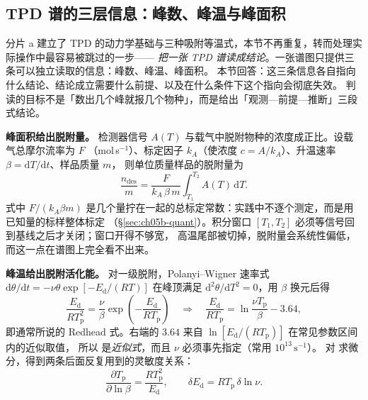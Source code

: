 \subsection{TPD 谱的三层信息：峰数、峰温与峰面积}
\label{sec:ch05b-read}

\begin{probout}
分片 a 建立了 TPD 的动力学基础与三种吸附等温式，本节不再重复，转而处理实际操作中最容易被跳过的一步——
\emph{把一张 TPD 谱读成结论}。一张谱图只提供三条可以独立读取的信息：峰数、峰温、峰面积。
本节回答：这三条信息各自指向什么结论、结论成立需要什么前提、以及在什么条件下这个指向会彻底失效。
判读的目标不是「数出几个峰就报几个物种」，而是给出「观测—前提—推断」三段式结论。
\end{probout}

\begin{principle}
\textbf{峰面积给出脱附量。} 检测器信号 $A(T)$ 与载气中脱附物种的浓度成正比。设载气总摩尔流率为 $F$
（mol\,s$^{-1}$）、标定因子 $k_A$（使浓度 $c=A/k_A$）、升温速率 $\beta=\mathrm{d}T/\mathrm{d}t$、样品质量 $m$，
则单位质量样品的脱附量为
\begin{equation}
\frac{n_{\mathrm{des}}}{m}
=\frac{F}{k_A\,\beta\,m}\int_{T_1}^{T_2} A(T)\,\mathrm{d}T .
\label{eq:ch05b-area}
\end{equation}
式中 $F/(k_A\beta m)$ 是几个量拧在一起的总标定常数：实践中不逐个测定，而是用已知量的标样整体标定
（\S\ref{sec:ch05b-quant}）。积分窗口 $[T_1,T_2]$ 必须等信号回到基线之后才关闭；窗口开得不够宽，
高温尾部被切掉，脱附量会系统性偏低，而这一点在谱图上完全看不出来。

\textbf{峰温给出脱附活化能。} 对一级脱附，Polanyi--Wigner 速率式
$\mathrm{d}\theta/\mathrm{d}t=-\nu\theta\exp[-E_{\mathrm d}/(RT)]$ 在峰顶满足
$\mathrm{d}^{2}\theta/\mathrm{d}T^{2}=0$，用 $\beta$ 换元后得
\begin{equation}
\frac{E_{\mathrm d}}{R T_{\mathrm p}^{2}}
=\frac{\nu}{\beta}\exp\!\left(-\frac{E_{\mathrm d}}{R T_{\mathrm p}}\right)
\quad\Longrightarrow\quad
\frac{E_{\mathrm d}}{R T_{\mathrm p}}
=\ln\frac{\nu T_{\mathrm p}}{\beta}-3.64 ,
\label{eq:ch05b-redhead}
\end{equation}
即通常所说的 Redhead 式。右端的 $3.64$ 来自 $\ln[E_{\mathrm d}/(RT_{\mathrm p})]$ 在常见参数区间内的近似取值，
所以  是\emph{近似式}，而且 $\nu$ 必须事先指定（常用 $10^{13}\,\mathrm{s^{-1}}$）。
对  求微分，得到两条后面反复用到的灵敏度关系：
\begin{equation}
\frac{\partial T_{\mathrm p}}{\partial\ln\beta}=\frac{R T_{\mathrm p}^{2}}{E_{\mathrm d}},
\qquad
\delta E_{\mathrm d}=R T_{\mathrm p}\,\delta\ln\nu .
\label{eq:ch05b-sens}
\end{equation}
\end{principle}

